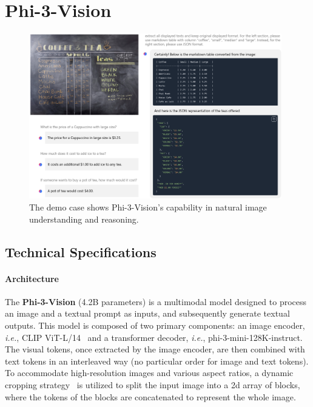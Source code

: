 \documentclass[11pt]{article}
\newcommand{\phivision}{Phi-3-Vision\xspace}
\begin{document}
\section{Phi-3-Vision}
\begin{figure}[h]
    \centering
    \includegraphics[width=0.98\textwidth]{phi3v-teaser.png}
    \caption{The demo case shows \phivision's capability in natural image understanding and reasoning.}
    \label{fig:v-safety-pt}
\end{figure}

\subsection{Technical Specifications}

\paragraph{Architecture}

The \textbf{\phivision} (4.2B parameters) is a multimodal model designed to process an image and a textual prompt as inputs, and subsequently generate textual outputs. This model is composed of two primary components: an image encoder, \emph{i.e.}, CLIP ViT-L/14~\cite{radford2021learning} and a transformer decoder, \emph{i.e.}, phi-3-mini-128K-instruct. The visual tokens, once extracted by the image encoder, are then combined with text tokens in an interleaved way (no particular order for image and text tokens). To accommodate high-resolution images and various aspect ratios, a dynamic cropping strategy~\cite{dong2024internlm} is utilized to split the input image into a 2d array of blocks, where the tokens of the blocks are concatenated to represent the whole image.  
\end{document}
